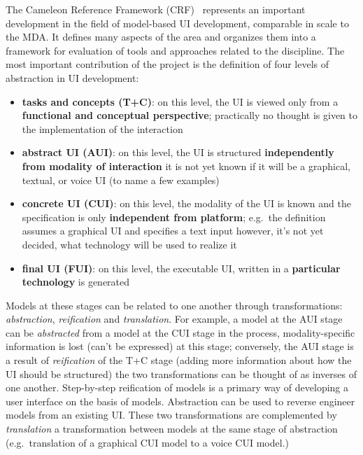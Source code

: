 The Cameleon Reference Framework (CRF)~\cite{calvary_cameleon_framework_2002, calvary_cameleon_glossary_2002} represents an important development in the field of model-based UI development, comparable in scale to the MDA\@.
It defines many aspects of the area and organizes them into a framework for evaluation of tools and approaches related to the discipline.
The most important contribution of the project is the definition of four levels of abstraction in UI development:
\begin{samepage}
\begin{itemize}
    \item \textbf{tasks and concepts (T+C)}: on this level, the UI is viewed only from a \textbf{functional and conceptual perspective};
    practically no thought is given to the implementation of the interaction
    \item \textbf{abstract UI (AUI)}: on this level, the UI is structured \textbf{independently from modality of interaction}\,\textendash\,it is not yet known if it will be a graphical, textual, or voice UI (to name a few examples)
    \item \textbf{concrete UI (CUI)}: on this level, the modality of the UI is known and the specification is only \textbf{independent from platform};
    e.g.\ the definition assumes a graphical UI and specifies a text input\,\textendash\,however, it's not yet decided, what technology will be used to realize it
    \item \textbf{final UI (FUI)}: on this level, the executable UI, written in a \textbf{particular technology} is generated
\end{itemize}
\end{samepage}
Models at these stages can be related to one another through transformations: \emph{abstraction}, \emph{reification} and \emph{translation}.
For example, a model at the AUI stage can be \emph{abstracted} from a model at the CUI stage\,\textendash\,in the process, modality-specific information is lost (can't be expressed) at this stage;
conversely, the AUI stage is a result of \emph{reification} of the T+C stage (adding more information about how the UI should be structured)\,\textendash\,the two transformations can be thought of as inverses of one another.
Step-by-step reification of models is a primary way of developing a user interface on the basis of models.
Abstraction can be used to reverse engineer models from an existing UI\@.
These two transformations are complemented by \emph{translation}\,\textendash\,a transformation between models at the same stage of abstraction (e.g.\ translation of a graphical CUI model to a voice CUI model.)

